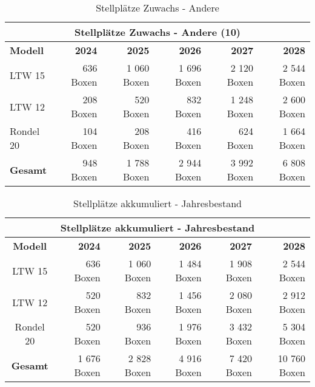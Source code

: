 \begin{table}[H]
    \centering
    \begin{tabular}{lrrrrr}
        \multicolumn{6}{c}{\textbf{Stellplätze Zuwachs - Andere (10)}}                                  \\
        \toprule
        \textbf{Modell} & \textbf{2024} & \textbf{2025} & \textbf{2026} & \textbf{2027} & \textbf{2028} \\
        \midrule
        LTW 15          & 636 Boxen     & 1 060 Boxen   & 1 696 Boxen   & 2 120 Boxen   & 2 544 Boxen   \\
        LTW 12          & 208 Boxen     & 520 Boxen     & 832 Boxen     & 1 248 Boxen   & 2 600 Boxen   \\
        Rondel 20       & 104 Boxen     & 208 Boxen     & 416 Boxen     & 624 Boxen     & 1 664 Boxen   \\
        \midrule
        \textbf{Gesamt} & 948 Boxen     & 1 788 Boxen   & 2 944 Boxen   & 3 992 Boxen   & 6 808 Boxen   \\
        \bottomrule
    \end{tabular}
    \caption{Stellplätze Zuwachs - Andere}
    \label{tab:stellplaetze_zuwachs_andere}
\end{table}

\begin{table}[H]
    \centering
    \begin{tabular}{crrrrr}
        \multicolumn{6}{c}{\textbf{Stellplätze akkumuliert - Jahresbestand}}                            \\
        \toprule
        \textbf{Modell} & \textbf{2024} & \textbf{2025} & \textbf{2026} & \textbf{2027} & \textbf{2028} \\
        \midrule
        LTW 15          & 636 Boxen     & 1 060 Boxen   & 1 484 Boxen   & 1 908 Boxen   & 2 544 Boxen   \\
        LTW 12          & 520 Boxen     & 832 Boxen     & 1 456 Boxen   & 2 080 Boxen   & 2 912 Boxen   \\
        Rondel 20       & 520 Boxen     & 936 Boxen     & 1 976 Boxen   & 3 432 Boxen   & 5 304 Boxen   \\
        \midrule
        \textbf{Gesamt} & 1 676 Boxen   & 2 828 Boxen   & 4 916 Boxen   & 7 420 Boxen   & 10 760 Boxen  \\
        \bottomrule
    \end{tabular}
    \caption{Stellplätze akkumuliert - Jahresbestand}
    \label{tab:stellplaetze_akkumuliert}
\end{table}

